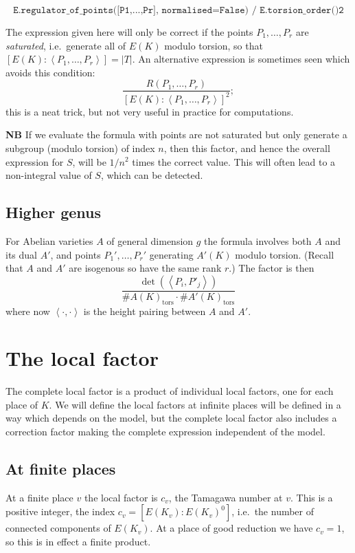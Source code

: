 \documentclass{amsart}
\DeclareMathOperator{\tors}{tors}
\begin{document}
\[
\texttt{E.regulator\_of\_points({[}P1,...,Pr{]}, normalised=False)\ /\ E.torsion\_order()\^{}2}
\]

The expression given here will only be correct if the points
\(P_1,\dots,P_r\) are \emph{saturated}, i.e.~generate all of \(E(K)\)
modulo torsion, so that
\([E(K):\left\langle P_1,\dots,P_r\right\rangle] = |T|\). An alternative
expression is sometimes seen which avoids this condition:
\[\frac{R(P_1,\dots,P_r)}{[E(K):\left\langle P_1,\dots,P_r\right\rangle]^2};\]
this is a neat trick, but not very useful in practice for computations.

\textbf{NB} If we evaluate the formula with points are not saturated
but only generate a subgroup (modulo torsion) of index \(n\), then
this factor, and hence the overall expression for \(S\), will be
\(1/n^2\) times the correct value. This will often lead to a
non-integral value of \(S\), which can be detected.

\subsection{Higher genus}\label{higher-genus}

For Abelian varieties \(A\) of general dimension \(g\) the formula
involves both \(A\) and its dual \(A'\), and points \(P_1',\dots,P_r'\)
generating \(A'(K)\) modulo torsion. (Recall that \(A\) and \(A'\) are
isogenous so have the same rank \(r\).) The factor is then
\[\frac{\det(\left\langle P_i,P'_j\right\rangle )}{\#A(K)_{\tors}\cdot \#A'(K)_{\tors}}\]
where now \(\left<\cdot,\cdot\right>\) is the height pairing between
\(A\) and \(A'\).

\section{The local factor}\label{local-factors}

The complete local factor is a product of individual local factors,
one for each place of \(K\). We will define the local factors at
infinite places will be defined in a way which depends on the model,
but the complete local factor also includes a correction factor making
the complete expression independent of the model.

\subsection{At finite places}\label{at-finite-places}

At a finite place \(v\) the local factor is \(c_v\), the Tamagawa number
at \(v\). This is a positive integer, the index
\(c_v = [E(K_v):E(K_v)^0]\), i.e.~the number of connected components of
\(E(K_v)\). At a place of good reduction we have \(c_v=1\), so this is
in effect a finite product.
\end{document}
